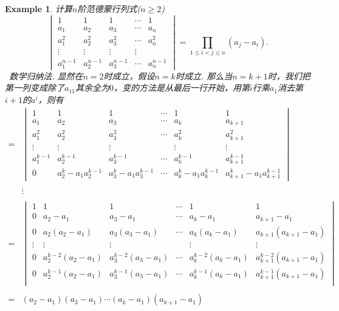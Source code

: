 \documentclass{article}
\newtheorem{example}[theorem]{Example}
\newcommand{\hints}{{\color{blue} \text{hints}}}
\begin{document}
\begin{example}
\rm 计算$n$阶{\color{red}范德蒙行列式}($n \geq 2$)
$$
\begin{vmatrix}
1 & 1 & 1 & \cdots & 1\\
a_1 & a_2 & a_3 & \cdots & a_n \\
a_1^2 & a_2^2 & a_3^2 & \cdots & a_n^2 \\
\vdots& \vdots& \vdots& \vdots & \\
a_1^{n-1} & a_2^{n-1} & a_3^{n-1} & \cdots & a_n^{n-1} 
\end{vmatrix} = \prod\limits_{1 \leq i < j \leq n}(a_j-a_i).
$$
\hints\ 数学归纳法.
显然在$n=2$时成立，假设$n=k$时成立. 那么当$n=k+1$时，我们把第一列变成除了$a_{11}$其余全为$0$，变的方法是从最后一行开始，用第$i$行乘$a_1$消去第$i+1$的$a^i$，则有
$$
\begin{array}{ll}
=&\begin{vmatrix}
1 & 1 & 1 & \cdots & 1 & 1\\
a_1 & a_2 & a_3 & \cdots & a_k & a_{k+1} \\
a_1^2 & a_2^2 & a_3^2 & \cdots & a_k^2 & a_{k+1}^2\\
\vdots& \vdots& \vdots&  & \vdots &\vdots \\
a_1^{k-1} & a_2^{k-1}& a_3^{k-1} & \cdots & a_k^{k-1} & a_{k+1}^{k-1} \\
0 & a_2^{k}-a_1a_2^{k-1} & a_3^{k}-a_1a_3^{k-1} & \cdots & a_k^{k}-a_1a_k^{k-1} & a_{k+1}^{k} - a_1a_{k+1}^{k-1} 
\end{vmatrix} \\ \\
&\vdots \\ \\
=& 
\begin{vmatrix}
1 & 1 & 1 & \cdots & 1 & 1\\
0 & a_2-a_1 & a_3-a_1 & \cdots & a_k-a_1 & a_{k+1}-a_1 \\
0 & a_2(a_2-a_1) & a_3(a_3-a_1) & \cdots & a_k(a_k-a_1) & a_{k+1}(a_{k+1}-a_1) \\
\vdots& \vdots& \vdots &  & \vdots & \vdots \\
0 & a_2^{k-2}(a_2-a_1) & a_3^{k-2}(a_3-a_1) & \cdots & a_k^{k-2}(a_k - a_1) & a_{k+1}^{k-2}(a_{k+1}-a_1) \\
0 & a_2^{k-1}(a_2-a_1) & a_3^{k-1}(a_3-a_1) & \cdots & a_{k}^{k-1}(a_{k} - a_1) & a_{k+1}^{k-1}(a_{k+1}-a_1) \\
\end{vmatrix} \\ \\
=& (a_2-a_1)(a_3-a_1)\cdots(a_k-a_1)(a_{k+1}-a_1)

\end{array}$$
\end{example}
\end{document}
